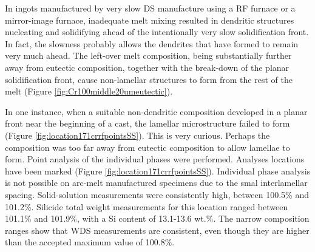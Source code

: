 In ingots manufactured by very slow DS manufacture using a RF furnace or a mirror-image furnace, inadequate melt mixing resulted in dendritic structures nucleating and solidifying ahead of the intentionally very slow solidification front.  In fact, the slowness probably allows the dendrites that have formed to remain very much ahead.  The left-over melt composition, being substantially further away from eutectic composition, together with the break-down of the planar solidification front, cause non-lamellar structures to form from the rest of the melt (Figure \ref{fig:Cr100middle20umeutectic}).

In one instance, when a suitable non-dendritic composition developed in a planar front near the beginning of a cast, the lamellar microstructure failed to form (Figure \ref{fig:location171crrfpointsSS}).  This is very curious.  Perhaps the composition was too far away from eutectic composition to allow lamellae to form.  Point analysis of the individual phases were performed.   Analyses locations have been marked (Figure \ref{fig:location171crrfpointsSS}).  Individual phase analysis is not possible on arc-melt manufactured specimens due to the smal interlamellar spacing.  Solid-solution measurements were consistently high, between 100.5\% and 101.2\%.  Silicide total weight measurements for this location ranged between 101.1\% and 101.9\%, with a Si content of 13.1-13.6 wt.\%.  The narrow composition ranges show that WDS measurements are consistent, even though they are higher than the accepted maximum value of 100.8\%.

